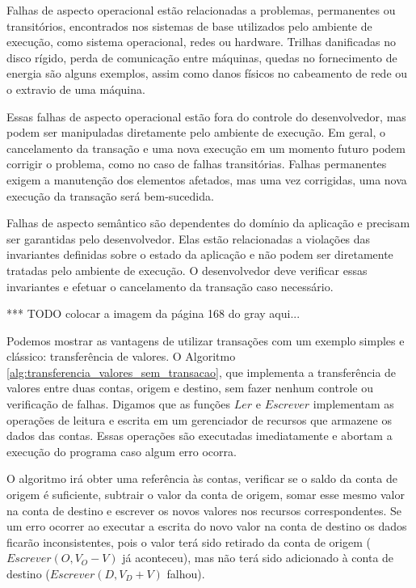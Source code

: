\documentclass[11pt,twoside,a4paper]{book}
\begin{document}
Falhas de aspecto operacional estão relacionadas a problemas, permanentes ou transitórios, encontrados nos sistemas de base utilizados pelo ambiente de execução, como sistema operacional, redes ou hardware. Trilhas danificadas no disco rígido, perda de comunicação entre máquinas, quedas no fornecimento de energia são alguns exemplos, assim como danos físicos no cabeamento de rede ou o extravio de uma máquina.

Essas falhas de aspecto operacional estão fora do controle do desenvolvedor, mas podem ser manipuladas diretamente pelo ambiente de execução. Em geral, o cancelamento da transação e uma nova execução em um momento futuro podem corrigir o problema, como no caso de falhas transitórias. Falhas permanentes exigem a manutenção dos elementos afetados, mas uma vez corrigidas, uma nova execução da transação será bem-sucedida.


Falhas de aspecto semântico são dependentes do domínio da aplicação e precisam ser garantidas pelo desenvolvedor. Elas estão relacionadas a violações das invariantes definidas sobre o estado da aplicação e não podem ser diretamente tratadas pelo ambiente de execução. O desenvolvedor deve verificar essas invariantes e efetuar o cancelamento da transação caso necessário.

*** TODO colocar a imagem da página 168 do gray aqui...

Podemos mostrar as vantagens de utilizar transações com um exemplo simples e clássico: transferência de valores. O Algoritmo \ref{alg:transferencia_valores_sem_transacao}, que implementa a transferência de valores entre duas contas, origem e destino, sem fazer nenhum controle ou verificação de falhas. Digamos que as funções $Ler$ e $Escrever$ implementam as operações de leitura e escrita em um gerenciador de recursos que armazene os dados das contas. Essas operações são executadas imediatamente e abortam a execução do programa caso algum erro ocorra.

O algoritmo irá obter uma referência às contas, verificar se o saldo da conta de origem é suficiente, subtrair o valor da conta de origem, somar esse mesmo valor na conta de destino e escrever os novos valores nos recursos correspondentes. Se um erro ocorrer ao executar a escrita do novo valor na conta de destino os dados ficarão inconsistentes, pois o valor terá sido retirado da conta de origem ($Escrever(O, V_O - V)$ já aconteceu), mas não terá sido adicionado à conta de destino ($Escrever(D, V_D + V)$ falhou).
\end{document}
